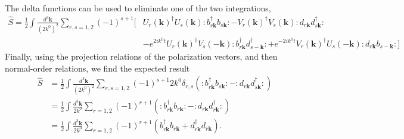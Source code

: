 The delta functions can be used to eliminate one of the two integrations,
\begin{equation}
\begin{aligned}
    \hat{S} = \frac{1}{2} \int \frac{d^3\mathbf{k}}{(2k^0)^2} \sum_{r,s=1,2} (-1)^{s+1} \bigg[ &U_r(\mathbf{k})^\dagger U_s(\mathbf{k}) : b^\dagger_{r\mathbf{k}} b_{s\mathbf{k}} : - V_r(\mathbf{k})^\dagger V_s(\mathbf{k}) : d_{r\mathbf{k}} d^\dagger_{s\mathbf{k}} : \\
    &- e^{2ik^0t} U_r(\mathbf{k})^\dagger V_s(-\mathbf{k}) : b^\dagger_{r\mathbf{k}} d^\dagger_{s-\mathbf{k}} : + e^{-2ik^0t} V_r(\mathbf{k})^\dagger U_s(-\mathbf{k}) : d_{r\mathbf{k}} b_{s-\mathbf{k}} : \bigg]
\end{aligned}
\end{equation}
Finally, using the projection relations of the polarization vectors, and then normal-order relations, we find the expected result
\begin{equation}
\begin{aligned}
    \hat{S} &= \frac{1}{2} \int \frac{d^3\mathbf{k}}{(2k^0)^2} \sum_{r,s=1,2} (-1)^{s+1} 2k^0 \delta_{r,s} \left( : b^\dagger_{r\mathbf{k}} b_{s\mathbf{k}} : - : d_{r\mathbf{k}} d^\dagger_{s\mathbf{k}} : \right) \\
    &= \frac{1}{2} \int \frac{d^3\mathbf{k}}{2k^0} \sum_{r=1,2} (-1)^{r+1} \left( : b^\dagger_{r\mathbf{k}} b_{r\mathbf{k}} : - : d_{r\mathbf{k}} d^\dagger_{r\mathbf{k}} : \right) \\
    &= \frac{1}{2} \int \frac{d^3\mathbf{k}}{2k^0} \sum_{r=1,2} (-1)^{r+1} \left( b^\dagger_{r\mathbf{k}} b_{r\mathbf{k}} + d^\dagger_{r\mathbf{k}} d_{r\mathbf{k}} \right).
\end{aligned}
\end{equation}

